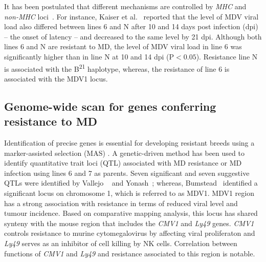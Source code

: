 It has been postulated that different mechanisms are
controlled by {\em MHC} and {\em non-MHC}
loci~\cite{kaiser2003differential}.  For instance, Kaiser et
al.~\cite{kaiser2003differential} reported that the level of
MDV viral load also differed between lines 6 and N after 10
and 14 days post infection (dpi) -- the onset of latency --
and decreased to the same level by 21 dpi.  Although both
lines 6 and N are resistant to MD, the level of MDV viral
load in line 6 was significantly higher than in line N at 10
and 14 dpi (P$<0.05$).  Resistance line N is associated
with the B\textsuperscript{21} haplotype, whereas, the
resistance of line 6 is associated with the MDV1 locus.


\subsection{Genome-wide scan for genes conferring resistance to MD}

Identification of precise genes is essential for developing
resistant breeds using a marker-assisted selection (MAS)
.  A genetic-driven method has been used to identify
quantitative trait loci (QTL) associated with MD resistance
or MD infection using lines 6 and 7 as parents.  Seven
significant and seven suggestive QTLs were identified by
Vallejo ~\cite{vallejo1998genetic} and
Yonash~\cite{yonash1999high}; whereas,
Bumstead~\cite{bumstead1998genomic} identified a significant
locus on chromosome 1, which is referred to as MDV1.  MDV1
region has a strong association with resistance in terms of
reduced viral level and tumour incidence.  Based on
comparative mapping analysis, this locus has shared
synteny with the mouse region that includes the {\em CMV1} and {\em
Ly49} genes.  {\em CMV1} controls resistance to murine
cytomegalovirus by affecting viral proliferaton and {\em
Ly49} serves as an inhibitor of cell killing by NK cells.
Correlation between functions of {\em CMV1} and {\em Ly49}
and resistance associated to this region is notable.

